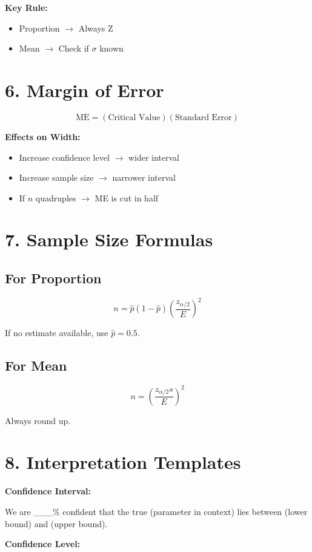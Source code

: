 \documentclass[11pt]{article}
\begin{document}
\textbf{Key Rule:}
\begin{itemize}
    \item Proportion $\rightarrow$ Always Z
    \item Mean $\rightarrow$ Check if $\sigma$ known
\end{itemize}

\section*{6. Margin of Error}

\[
\text{ME} = (\text{Critical Value})(\text{Standard Error})
\]

\textbf{Effects on Width:}
\begin{itemize}
    \item Increase confidence level $\rightarrow$ wider interval
    \item Increase sample size $\rightarrow$ narrower interval
    \item If $n$ quadruples $\rightarrow$ ME is cut in half
\end{itemize}

\section*{7. Sample Size Formulas}

\subsection*{For Proportion}
\[
n = \hat{p}(1-\hat{p})\left(\frac{z_{\alpha/2}}{E}\right)^2
\]

If no estimate available, use $\hat{p} = 0.5$.

\subsection*{For Mean}
\[
n = \left(\frac{z_{\alpha/2}s}{E}\right)^2
\]

Always round up.

\section*{8. Interpretation Templates}

\textbf{Confidence Interval:}

We are \_\_\_\% confident that the true (parameter in context) lies between (lower bound) and (upper bound).

\textbf{Confidence Level:}
\end{document}
